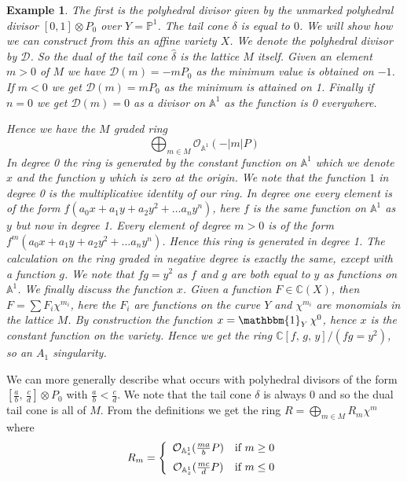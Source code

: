 \documentclass[12pt]{amsart}
\theoremstyle{plain}
\newtheorem{ex}[thm]{Example}
\newcommand{\mb}[1]{\mathbb{#1}}
\begin{document}
\begin{ex}\rm
The first is the polyhedral divisor given by the unmarked polyhedral divisor $[0, 1] \otimes P_0$ over $Y = \mb{P}^1$. 
The tail cone $\delta$ is equal to $0$. We will show how we can construct from this an affine variety $X$. We denote the polyhedral divisor by $\mathcal{D}$. So the dual of the tail cone $\hat{\delta}$ is the lattice $M$ itself. Given an element $ m >0$ of $M$ we have $\mathcal{D}(m) = -mP_0$ as the minimum value is obtained on $-1$. If $m <0$ we get $\mathcal{D}(m) = mP_0$  as the minimum is attained on 1. Finally if $n=0$ we get $\mathcal{D}(m) = 0$ as a divisor on $\mathbb{A}^1$ as the function is 0 everywhere. 


Hence we have the $M$ graded ring
\[
\bigoplus_{m \in M} \mathcal{O}_{\mathbb{A}^1}(-|m|P)
\]
In degree 0 the ring is generated by the constant function on $\mb{A}^1$ which we denote $x$ and the function $y$ which is zero at the origin. We note that the function $1$ in degree 0 is the multiplicative identity of our ring. In degree one every element is of the form $f ( a_0 x + a_1 y + a_2 y^2 + \dots  a_n y^n)$, here $f$ is the same function on $\mb{A}^1$ as $y$ but now in degree 1. Every element of degree $m>0$ is of the form $f^m ( a_0 x + a_1 y + a_2 y^2 + \dots  a_n y^n)$. Hence this ring is generated in degree 1. The calculation on the ring graded in negative degree is exactly the same, except with a function $g$.  We note that $fg = y^2$ as $f$ and $g$ are both equal to $y$ as functions on $\mb{A}^1$. We finally discuss the function $x$. Given a function $F \in \mb{C}(X)$, then $F = \sum F_i \chi^{m_i}$, here the $F_i$ are functions on the curve $Y$ and $\chi^{m_i}$ are monomials in the lattice $M$. By construction the function $x = \mathbbm{1}_{Y} \, \chi^0$, hence $x$ is the constant function on the variety. Hence we get the ring $\mathbb{C}[f,  \, g, \, y]/ (fg=y^2)$, so an $A_1$ singularity.
\end{ex}

We can more generally describe what occurs with polyhedral divisors of the form $[\frac{a}{b}, \, \frac{c}{d}] \otimes P_0$ with $\frac{a}{b} < \frac{c}{d}$. We note that the tail cone $\delta$ is always 0 and so the dual tail cone is all of $M$. From the definitions we get the ring $R = \bigoplus_{m \in M} R_m \chi^m$ where
\[
R_m = 
\left\{
\begin{array}{cc}
\mathcal{O}_{\mb{A}_z^1} ( \frac{ma}{b}P) & \text{if } m \geq 0  \vspace{0.2cm} \\
\mathcal{O}_{\mb{A}_z^1} ( \frac{mc}{d}P) & \text{if } m \leq 0 
\end{array}
\right.
\]
\end{document}
